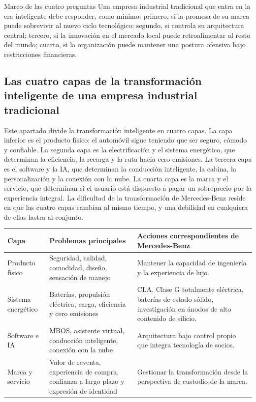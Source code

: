 \documentclass[a4paper]{article}
\begin{document}
\begin{importantbox}{Marco de las cuatro preguntas}
Una empresa industrial tradicional que entra en la era inteligente debe responder, como mínimo: primero, si la promesa de su marca puede sobrevivir al nuevo ciclo tecnológico; segundo, si controla su arquitectura central; tercero, si la innovación en el mercado local puede retroalimentar al resto del mundo; cuarto, si la organización puede mantener una postura ofensiva bajo restricciones financieras.
\end{importantbox}

\subsection{Las cuatro capas de la transformación inteligente de una empresa industrial tradicional}

Este apartado divide la transformación inteligente en cuatro capas. La capa inferior es el producto físico: el automóvil sigue teniendo que ser seguro, cómodo y confiable. La segunda capa es la electrificación y el sistema energético, que determinan la eficiencia, la recarga y la ruta hacia cero emisiones. La tercera capa es el software y la IA, que determinan la conducción inteligente, la cabina, la personalización y la conexión con la nube. La cuarta capa es la marca y el servicio, que determinan si el usuario está dispuesto a pagar un sobreprecio por la experiencia integral. La dificultad de la transformación de Mercedes-Benz reside en que las cuatro capas cambian al mismo tiempo, y una debilidad en cualquiera de ellas lastra al conjunto.

\noindent\begin{tabularx}{\textwidth}{p{}p{}X}
\toprule
Capa & Problemas principales & Acciones correspondientes de Mercedes-Benz \\
\midrule
Producto físico & Seguridad, calidad, comodidad, diseño, sensación de manejo & Mantener la capacidad de ingeniería y la experiencia de lujo. \\
Sistema energético & Baterías, propulsión eléctrica, carga, eficiencia y cero emisiones & CLA, Clase G totalmente eléctrica, baterías de estado sólido, investigación en ánodos de alto contenido de silicio. \\
Software e IA & MBOS, asistente virtual, conducción inteligente, conexión con la nube & Arquitectura bajo control propio que integra tecnología de socios. \\
Marca y servicio & Valor de reventa, experiencia de compra, confianza a largo plazo y expresión de identidad & Gestionar la transformación desde la perspectiva de custodio de la marca. \\
\bottomrule
\end{tabularx}
\end{document}
